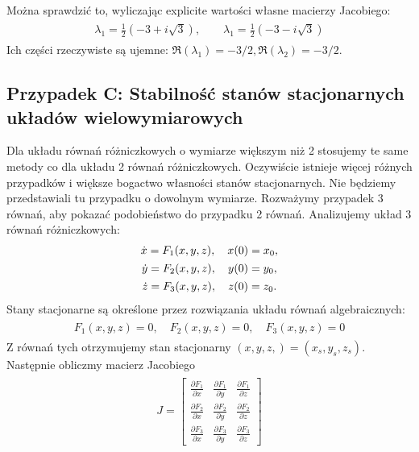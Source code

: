 \documentclass[a4paper,12pt,polish]{sphinxmanual}
\begin{document}
Można sprawdzić to, wyliczając explicite wartości własne macierzy Jacobiego:
\label{ch1/chI023:equation-eqn51}\begin{gather}
\begin{split}\lambda_1 = \frac{1}{2} (-3+i \sqrt 3), \qquad \lambda_1 = \frac{1}{2} (-3-i \sqrt 3)\end{split}\label{ch1/chI023-eqn51}
\end{gather}
Ich części rzeczywiste są ujemne:  $\Re(\lambda_1) = -3/2,  \Re(\lambda_2) = -3/2$.


\subsection{Przypadek C: Stabilność stanów stacjonarnych układów wielowymiarowych}
\label{ch1/chI023:przypadek-c-stabilnosc-stanow-stacjonarnych-ukladow-wielowymiarowych}
Dla układu równań różniczkowych o wymiarze większym niż 2 stosujemy te same metody co dla układu 2 równań różniczkowych.  Oczywiście istnieje więcej różnych przypadków i większe bogactwo własności  stanów stacjonarnych.  Nie będziemy przedstawiali tu przypadku o dowolnym wymiarze. Rozważymy przypadek 3 równań, aby pokazać podobieństwo do przypadku 2 równań. Analizujemy układ 3 równań różniczkowych:
\label{ch1/chI023:equation-eqn52}\begin{gather}
\begin{split}\dot x = F_1(x, y, z), \quad x(0) = x_0,\end{split}\label{ch1/chI023-eqn52}\\\begin{split}\dot y = F_2(x, y, z),  \quad y(0) = y_0,\end{split}\notag\\\begin{split}\dot z = F_3(x, y, z),  \quad z(0) = z_0.\end{split}\notag
\end{gather}
Stany stacjonarne są określone przez rozwiązania układu równań algebraicznych:
\label{ch1/chI023:equation-eqn53}\begin{gather}
\begin{split}F_1(x, y, z) = 0, \quad  F_2(x, y, z) = 0,  \quad  F_3(x, y, z)=0\end{split}\label{ch1/chI023-eqn53}
\end{gather}
Z równań tych otrzymujemy  stan stacjonarny   $(x, y, z,) = (x_{s}, y_{s}, z_s)$. Następnie obliczmy macierz Jacobiego
\label{ch1/chI023:equation-eqn54}\begin{gather}
\begin{split} J = \begin{bmatrix}\frac{ \partial F_1}{\partial x}& \frac{\partial F_1}{\partial y}&\frac{ \partial F_1}{\partial z}\\ \frac{ \partial F_2}{\partial x}&  \frac{ \partial F_2}{\partial y} &\frac{ \partial F_2}{\partial z} \\ \frac{ \partial F_3}{\partial x}& \frac{ \partial F_3}{\partial y}&\frac{ \partial F_3}{\partial z} \end{bmatrix}\end{split}\label{ch1/chI023-eqn54}
\end{gather}
\end{document}
